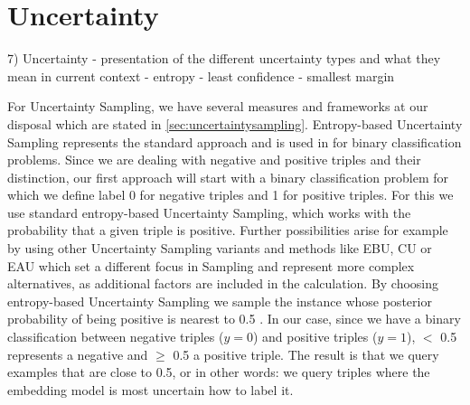 \section{Uncertainty} 
\label{sec:uncertainty}

7) Uncertainty
- presentation of the different uncertainty types and what they mean in current context
- entropy
- least confidence
- smallest margin


For Uncertainty Sampling, we have several measures and frameworks at our disposal which are stated in \autoref{sec:uncertaintysampling}.
Entropy-based Uncertainty Sampling represents the standard approach and is used in for binary classification problems.
Since we are dealing with negative and positive triples and their distinction, our first approach will start with a binary classification problem for which we define label 0 for negative triples and 1 for positive triples.
For this we use standard entropy-based Uncertainty Sampling, which works with the probability that a given triple is positive. 
Further possibilities arise for example by using other Uncertainty Sampling variants and methods like \ac{EBU}, \ac{CU} or \ac{EAU} which set a different focus in Sampling and represent more complex alternatives, as additional factors are included in the calculation.
By choosing entropy-based Uncertainty Sampling we sample the instance whose posterior probability of being positive is nearest to 0.5 \cite{Settles2009ActiveLL}.
In our case, since we have a binary classification between negative triples ($y=0$) and positive triples ($y=1$), $<$ 0.5 represents a negative and $\geq$ 0.5 a positive triple.
The result is that we query examples that are close to 0.5, or in other words: 
we query triples where the embedding model is most uncertain how to label it.